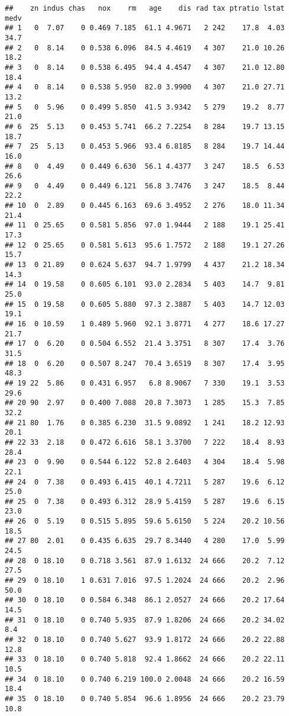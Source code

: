 \documentclass[]{article}
\begin{document}
\begin{verbatim}
##    zn indus chas   nox    rm   age    dis rad tax ptratio lstat medv
## 1   0  7.07    0 0.469 7.185  61.1 4.9671   2 242    17.8  4.03 34.7
## 2   0  8.14    0 0.538 6.096  84.5 4.4619   4 307    21.0 10.26 18.2
## 3   0  8.14    0 0.538 6.495  94.4 4.4547   4 307    21.0 12.80 18.4
## 4   0  8.14    0 0.538 5.950  82.0 3.9900   4 307    21.0 27.71 13.2
## 5   0  5.96    0 0.499 5.850  41.5 3.9342   5 279    19.2  8.77 21.0
## 6  25  5.13    0 0.453 5.741  66.2 7.2254   8 284    19.7 13.15 18.7
## 7  25  5.13    0 0.453 5.966  93.4 6.8185   8 284    19.7 14.44 16.0
## 8   0  4.49    0 0.449 6.630  56.1 4.4377   3 247    18.5  6.53 26.6
## 9   0  4.49    0 0.449 6.121  56.8 3.7476   3 247    18.5  8.44 22.2
## 10  0  2.89    0 0.445 6.163  69.6 3.4952   2 276    18.0 11.34 21.4
## 11  0 25.65    0 0.581 5.856  97.0 1.9444   2 188    19.1 25.41 17.3
## 12  0 25.65    0 0.581 5.613  95.6 1.7572   2 188    19.1 27.26 15.7
## 13  0 21.89    0 0.624 5.637  94.7 1.9799   4 437    21.2 18.34 14.3
## 14  0 19.58    0 0.605 6.101  93.0 2.2834   5 403    14.7  9.81 25.0
## 15  0 19.58    0 0.605 5.880  97.3 2.3887   5 403    14.7 12.03 19.1
## 16  0 10.59    1 0.489 5.960  92.1 3.8771   4 277    18.6 17.27 21.7
## 17  0  6.20    0 0.504 6.552  21.4 3.3751   8 307    17.4  3.76 31.5
## 18  0  6.20    0 0.507 8.247  70.4 3.6519   8 307    17.4  3.95 48.3
## 19 22  5.86    0 0.431 6.957   6.8 8.9067   7 330    19.1  3.53 29.6
## 20 90  2.97    0 0.400 7.088  20.8 7.3073   1 285    15.3  7.85 32.2
## 21 80  1.76    0 0.385 6.230  31.5 9.0892   1 241    18.2 12.93 20.1
## 22 33  2.18    0 0.472 6.616  58.1 3.3700   7 222    18.4  8.93 28.4
## 23  0  9.90    0 0.544 6.122  52.8 2.6403   4 304    18.4  5.98 22.1
## 24  0  7.38    0 0.493 6.415  40.1 4.7211   5 287    19.6  6.12 25.0
## 25  0  7.38    0 0.493 6.312  28.9 5.4159   5 287    19.6  6.15 23.0
## 26  0  5.19    0 0.515 5.895  59.6 5.6150   5 224    20.2 10.56 18.5
## 27 80  2.01    0 0.435 6.635  29.7 8.3440   4 280    17.0  5.99 24.5
## 28  0 18.10    0 0.718 3.561  87.9 1.6132  24 666    20.2  7.12 27.5
## 29  0 18.10    1 0.631 7.016  97.5 1.2024  24 666    20.2  2.96 50.0
## 30  0 18.10    0 0.584 6.348  86.1 2.0527  24 666    20.2 17.64 14.5
## 31  0 18.10    0 0.740 5.935  87.9 1.8206  24 666    20.2 34.02  8.4
## 32  0 18.10    0 0.740 5.627  93.9 1.8172  24 666    20.2 22.88 12.8
## 33  0 18.10    0 0.740 5.818  92.4 1.8662  24 666    20.2 22.11 10.5
## 34  0 18.10    0 0.740 6.219 100.0 2.0048  24 666    20.2 16.59 18.4
## 35  0 18.10    0 0.740 5.854  96.6 1.8956  24 666    20.2 23.79 10.8

\end{verbatim}
\end{document}
